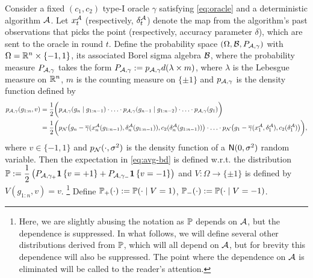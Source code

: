 Consider a fixed $(c_1,c_2)$ type-I oracle $\gamma$ satisfying \eqref{eq:oracle} and a deterministic algorithm $\A$. Let $x_t^{\A}$ (respectively, $\delta_t^{\A}$) denote the map from the algorithm's past observations that picks the point (respectively, accuracy parameter $\delta$), which are sent to the oracle in round $t$. Define the probability space $(\Omega, \B, P_{\A,\gamma})$ with
$\Omega = \R^n\times \{-1,1\}$,  its associated Borel sigma algebra $\B$, where the probability measure
$P_{\A,\gamma}$ takes the form $P_{\A,\gamma} := p_{\A,\gamma} d(\lambda \times m)$, 
where
	$\lambda$ is the Lebesgue measure on $\R^n$, 
	$m$ is the counting measure on $\{\pm 1\}$ and 
	$p_{\A,\gamma}$ is the density function defined by
\begin{align*}
p_{\A,\gamma}(g_{1:n}, v) 
&= \frac{1}{2} \bigg( p_{\A,\gamma}(g_n \mid g_{1:n-1})
		\cdot \ldots \cdot p_{\A,\gamma }(g_{n-1} \mid g_{1:n-2}) \cdot \ldots \cdot p_{\A,\gamma}(g_1) \bigg) \\
&=  \frac{1}{2} \bigg( p_{\N}\big(g_n - 
				\overline{\gamma}(x_n^{\A}(g_{1:n-1}),\delta_n^{\A}(g_{1:n-1})),c_2(\delta_n^{\A}(g_{1:n-1}))\big) \cdot
									 \ldots \cdot  p_{\N}\big(g_1 - \overline{\gamma}(x_1^{\A},\delta_1^{\A}),c_2(\delta_1^{\A})\big) \bigg),
\end{align*}
where $v\in\{-1,1\}$ and $p_{\N}(\cdot,\sigma^2)$ is the density function of a $\normal(0,\sigma^2)$ random variable.
Then the expectation in \eqref{eq:avg-bd} is defined w.r.t. the distribution $\P:= \dfrac{1}{2} \left(P_{\A, \gamma_+} \indic{v=+1} + P_{\A, \gamma_-}\indic{v=-1}\right)$ and $V: \Omega \to \{\pm 1 \}$ is defined by $V(g_{1:n},v) = v$.%
\footnote{Here, we are slightly abusing the notation as $\P$ depends on $\A$, but the dependence is suppressed.
In what follows, we will define several other distributions derived from $\P$, which will all depend on $\A$, but
for brevity this dependence will also be suppressed.
The point where the dependence on $\A$ is eliminated will be called to the reader's attention.}
Define $\P_{+}(\cdot) := \P(\cdot\mid V=1)$, $\P_{-}(\cdot) := \P(\cdot\mid
V=-1)$. 
